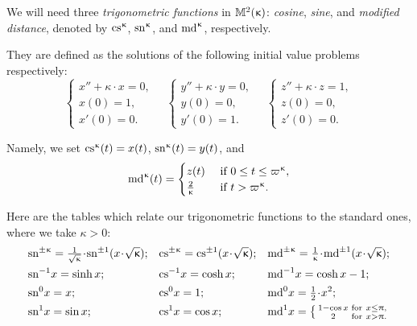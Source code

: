 We will need three \textit{trigonometric functions} in $\mathbb{M}_{{}}^{2}({\upkappa})$: {}\emph{cosine}, {}\emph{sine}, and {}\emph{modified distance}, denoted by $\mathrm{cs}^{\upkappa}$, $\mathrm{sn}^{\upkappa}$, and $\mathrm{md}^{\upkappa}$, respectively. 

They are defined as the solutions of the following initial value problems respectively:
\[
\begin{cases}
 x''+\kappa\cdot x=0,\\
 x(0)=1,\\
 x'(0)=0.
 \end{cases} 
 \quad 
 \begin{cases}
 y''+\kappa\cdot y=0,\\
 y(0)=0,\\
 y'(0)=1.
 \end{cases} 
\quad
 \begin{cases}
 z''+\kappa\cdot z=1,\\
 z(0)=0,\\
 z'(0)=0.
 \end{cases} 
\]

Namely, we set $\mathrm{cs}^{\upkappa}(t)=x(t)$, $\mathrm{sn}^{\upkappa}(t)=y(t)$, and 
\[
\md\kappa(t)=
\begin{cases}
z(t)& \textrm{ if } 0\le t\le \varpi\kappa,
\\
\tfrac{2}{\kappa}& \textrm{ if } t> \varpi\kappa.
\end{cases}
\]

Here are the tables which relate our trigonometric functions to the standard ones, where 
we take $\kappa>0$:
{\small
\begin{align*}
&\sn{\pm\kappa}=\tfrac{1}{\sqrt{\kappa}}\cdot \sn{\pm1}({x}\cdot {\sqrt{\kappa}});
&
&\cs{\pm\kappa}=\cs{\pm1}({x}\cdot {\sqrt{\kappa}});
&
&\md{\pm\kappa}
=
\tfrac{1}{\kappa}\cdot \md{\pm1}({x}\cdot {\sqrt{\kappa}});
\\
&\sn{-1} x=\sinh x;
&
&\cs{-1} x=\cosh x;
&
&\md{-1} x=\cosh x-1;
\\
&\sn{0} x=x;
&
&\cs{0} x=1;
&
&\md{0} x=\tfrac{1}{2}\cdot x^2; 
\\
&\sn{1} x=\sin x;
&
&\cs{1} x= \cos x;
&
&\md{1} x
=
\left\{\begin{smallmatrix}
1-\cos x&\text{for}\ x\le \pi,
\\
2&\text{for}\ x >\pi.
\end{smallmatrix}
\right.
\end{align*}
}


